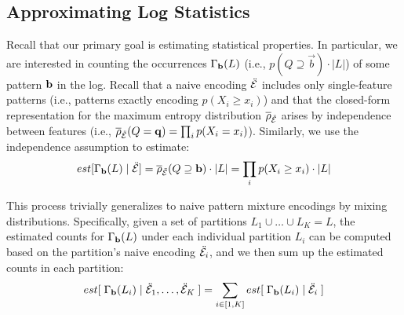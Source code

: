 \subsection{Approximating Log Statistics}
Recall that our primary goal is estimating statistical properties.
In particular, we are interested in counting the occurrences $\Gamma_{\mathbf{b}}(L)$ (i.e., $p(Q\supseteq\vec b)\cdot |L|$) of some pattern $\mathbf{b}$ in the log.
Recall that a naive encoding $\ddot{\mathcal E}$ includes only single-feature patterns (i.e., patterns exactly encoding $p(X_i\ge x_i)$) and that the closed-form representation for the maximum entropy distribution $\overline \rho_{\ddot{\mathcal E}}$ arises by independence between features (i.e., $\overline \rho_{\ddot{\mathcal E}}(Q = \mathbf{q}) = \prod_{i} p(X_i = x_i)$).
Similarly, we use the independence assumption to estimate:
$$est[\Gamma_{\mathbf{b}}(L)\;|\;\ddot{\mathcal E}]=\overline \rho_{\ddot{\mathcal E}}(Q \supseteq \mathbf{b})\cdot |L| = \prod_{i} p(X_i \geq x_i)\cdot |L|$$

This process trivially generalizes to naive pattern mixture encodings by mixing distributions.  
Specifically, given a set of partitions $L_1 \cup \ldots \cup L_K = L$, the estimated counts for $\Gamma_{\mathbf{b}}(L)$ under each individual partition $L_i$ can be computed based on the partition's naive encoding $\ddot{\mathcal E}_i$, and we then sum up the estimated counts in each partition:
$$est[\;\Gamma_{\mathbf{b}}(L_i)\;|\;\ddot{\mathcal E}_1, \ldots, \ddot{\mathcal E}_K\;] = \sum_{i \in [1, K]} est[\;\Gamma_{\mathbf{b}}(L_i)\;|\;\ddot{\mathcal E}_i\;]$$

